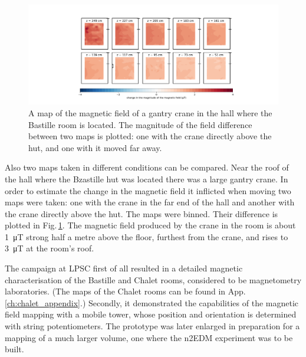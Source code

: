 \begin{figure}
  \centering
  \includegraphics[width=\linewidth]{gfx/mapping/lpsc/bastille_crane_change_magnitude_crop.pdf}
  \caption{A map of the magnetic field of a gantry crane in the hall where the Bastille room is located. The magnitude of the field difference between two maps is plotted: one with the crane directly above the hut, and one with it moved far away.}\label{fig:mapping_bastille_crane_change}
\end{figure}

Also two maps taken in different conditions can be compared. Near the roof of the hall where the Bzastille hut was located there was a large gantry crane. In order to estimate the change in the magnetic field it inflicted when moving two maps were taken: one with the crane in the far end of the hall and another with the crane directly above the hut. The maps were binned. Their difference is plotted in Fig.\,\ref{fig:mapping_bastille_crane_change}. The magnetic field produced by the crane in the room is about \SI{1}{\micro\tesla} strong half a metre above the floor, furthest from the crane, and rises to \SI{3}{\micro\tesla} at the room's roof.



The campaign at LPSC first of all resulted in a detailed magnetic characterisation of the Bastille and Chalet rooms, considered to be magnetometry laboratories. (The maps of the Chalet rooms can be found in App.\,\ref{ch:chalet_appendix}.) Secondly, it demonstrated the capabilities of the magnetic field mapping with a mobile tower, whose position and orientation is determined with string potentiometers. The prototype was later enlarged in preparation for a mapping of a much larger volume, one where the n2EDM experiment was to be built.




